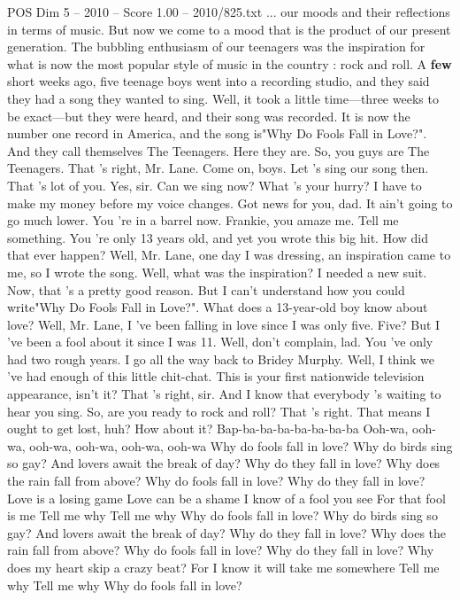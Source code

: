 \begin{textsample}{POS Dim 5 – 2010 – Score 1.00 – 2010/825.txt}  \label{ex:f5_pos_037}
... our moods and their reflections in terms of music.
But now we come to a mood that is the product of our present generation.
The bubbling enthusiasm of our teenagers was the inspiration for what is now the most popular style of music in the country : rock and roll.
A \textbf{few} short weeks ago, five teenage boys went into a recording studio, and they said they had a song they wanted to sing.
Well, it took a little time—three weeks to be exact—but they were heard, and their song was recorded.
It is now the number one record in America, and the song is"Why Do Fools Fall in Love?".
And they call themselves The Teenagers.
Here they are.
So, you guys are The Teenagers.
That 's right, Mr.
Lane.
Come on, boys.
Let 's sing our song then.
That 's lot of you.
Yes, sir.
Can we sing now?
What 's your hurry?
I have to make my money before my voice changes.
Got news for you, dad.
It ain't going to go much lower.
You 're in a barrel now.
Frankie, you amaze me.
Tell me something.
You 're only 13 years old, and yet you wrote this big hit.
How did that ever happen?
Well, Mr.
Lane, one day I was dressing, an inspiration came to me, so I wrote the song.
Well, what was the inspiration?
I needed a new suit.
Now, that 's a pretty good reason.
But I can't understand how you could write"Why Do Fools Fall in Love?".
What does a 13-year-old boy know about love?
Well, Mr.
Lane, I 've been falling in love since I was only five.
Five?
But I 've been a fool about it since I was 11.
Well, don't complain, lad.
You 've only had two rough years.
I go all the way back to Bridey Murphy.
Well, I think we 've had enough of this little chit-chat.
This is your first nationwide television appearance, isn't it?
That 's right, sir.
And I know that everybody 's waiting to hear you sing.
So, are you ready to rock and roll?
That 's right.
That means I ought to get lost, huh?
How about it?
Bap-ba-ba-ba-ba-ba-ba-ba Ooh-wa, ooh-wa, ooh-wa, ooh-wa, ooh-wa, ooh-wa Why do fools fall in love?
Why do birds sing so gay?
And lovers await the break of day?
Why do they fall in love?
Why does the rain fall from above?
Why do fools fall in love?
Why do they fall in love?
Love is a losing game Love can be a shame I know of a fool you see For that fool is me Tell me why Tell me why Why do fools fall in love?
Why do birds sing so gay?
And lovers await the break of day?
Why do they fall in love?
Why does the rain fall from above?
Why do fools fall in love?
Why do they fall in love?
Why does my heart skip a crazy beat?
For I know it will take me somewhere Tell me why Tell me why Why do fools fall in love?

\end{textsample}
